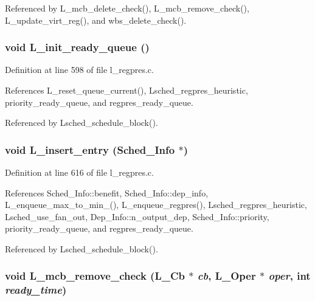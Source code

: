 Referenced by L\_\-mcb\_\-delete\_\-check(), L\_\-mcb\_\-remove\_\-check(), L\_\-update\_\-virt\_\-reg(), and wbs\_\-delete\_\-check().
\subsubsection{\setlength{\rightskip}{0pt plus 5cm}void L\_\-init\_\-ready\_\-queue ()}\label{l__schedule_8h_ce269a612036a7f00eed18771f53b4f4}




Definition at line 598 of file l\_\-regpres.c.

References L\_\-reset\_\-queue\_\-current(), Lsched\_\-regpres\_\-heuristic, priority\_\-ready\_\-queue, and regpres\_\-ready\_\-queue.

Referenced by Lsched\_\-schedule\_\-block().
\subsubsection{\setlength{\rightskip}{0pt plus 5cm}void L\_\-insert\_\-entry (\bf{Sched\_\-Info} $\ast$)}\label{l__schedule_8h_c7b001641028f429393021b0f92eb846}




Definition at line 616 of file l\_\-regpres.c.

References Sched\_\-Info::benefit, Sched\_\-Info::dep\_\-info, L\_\-enqueue\_\-max\_\-to\_\-min\_(), L\_\-enqueue\_\-regpres(), Lsched\_\-regpres\_\-heuristic, Lsched\_\-use\_\-fan\_\-out, Dep\_\-Info::n\_\-output\_\-dep, Sched\_\-Info::priority, priority\_\-ready\_\-queue, and regpres\_\-ready\_\-queue.

Referenced by Lsched\_\-schedule\_\-block().
\subsubsection{\setlength{\rightskip}{0pt plus 5cm}void L\_\-mcb\_\-remove\_\-check (L\_\-Cb $\ast$ {\em cb}, L\_\-Oper $\ast$ {\em oper}, int {\em ready\_\-time})}\label{l__schedule_8h_86fbe77057384630ecf6336d91ed3fc5}




